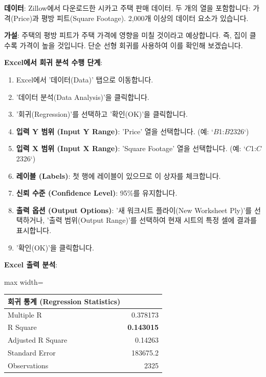\documentclass[11pt,a4paper]{article}
\begin{document}
\begin{tcolorbox}[examplebox, title=Excel 실습: Zillow 주택 데이터]
\textbf{데이터}: Zillow에서 다운로드한 시카고 주택 판매 데이터. 두 개의 열을 포함합니다: 가격(Price)과 평방 피트(Square Footage). 2,000개 이상의 데이터 요소가 있습니다.

\textbf{가설}: 주택의 평방 피트가 주택 가격에 영향을 미칠 것이라고 예상합니다. 즉, 집이 클수록 가격이 높을 것입니다. 단순 선형 회귀를 사용하여 이를 확인해 보겠습니다.

\textbf{Excel에서 회귀 분석 수행 단계}:
\begin{enumerate}[label=\arabic*.]
    \item Excel에서 '데이터(Data)' 탭으로 이동합니다.
    \item '데이터 분석(Data Analysis)'을 클릭합니다.
    \item '회귀(Regression)'를 선택하고 '확인(OK)'을 클릭합니다.
    \item \textbf{입력 Y 범위 (Input Y Range)}: 'Price' 열을 선택합니다. (예: `$B$1:$B$2326`)
    \item \textbf{입력 X 범위 (Input X Range)}: 'Square Footage' 열을 선택합니다. (예: `$C$1:$C$2326`)
    \item \textbf{레이블 (Labels)}: 첫 행에 레이블이 있으므로 이 상자를 체크합니다.
    \item \textbf{신뢰 수준 (Confidence Level)}: 95\%를 유지합니다.
    \item \textbf{출력 옵션 (Output Options)}: '새 워크시트 플라이(New Worksheet Ply)'를 선택하거나, '출력 범위(Output Range)'를 선택하여 현재 시트의 특정 셀에 결과를 표시합니다.
    \item '확인(OK)'을 클릭합니다.
\end{enumerate}

\textbf{Excel 출력 분석}:
\begin{adjustbox}{max width=\textwidth}
\begin{tabular}{lr}
\toprule
\textbf{회귀 통계 (Regression Statistics)} & \\
\midrule
Multiple R & 0.378173 \\
R Square & \textbf{0.143015} \\
Adjusted R Square & 0.14263 \\
Standard Error & 183675.2 \\
Observations & 2325 \\
\bottomrule
\end{tabular}
\end{adjustbox}


\end{tcolorbox}
\end{document}
